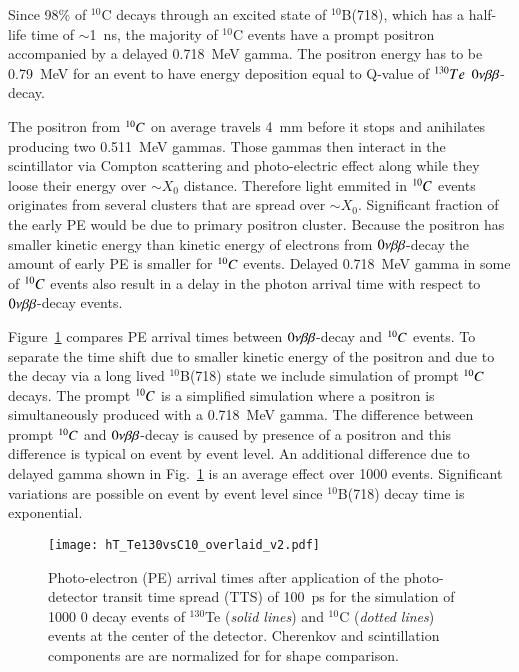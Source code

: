 Since 98\% of $^{10}$C decays through an excited state of $^{10}$B(718), 
which has a half-life time of $\sim$1~ns, the majority of $^{10}$C events have 
a prompt positron accompanied by a delayed 0.718~MeV gamma. The positron energy
has to be 0.79~MeV for an event to have energy deposition equal to Q-value of
$^{130}Te$ $0\nu\beta\beta$-decay.

The positron from $^{10}C$ on average travels 4~mm before it stops and anihilates
producing two 0.511~MeV gammas. Those gammas then interact in the scintillator via 
Compton scattering and photo-electric effect along while they loose their energy
over $\sim X_0$ distance. Therefore light emmited in $^{10}C$ events originates from
several clusters that are spread over $\sim X_0$. Significant fraction of the 
early PE would be due to primary positron cluster. Because the positron has smaller 
kinetic energy than kinetic energy of electrons from $0\nu\beta\beta$-decay the amount of early 
PE is smaller for $^{10}C$ events. Delayed 0.718~MeV gamma in some of $^{10}C$ events 
also result in a delay in the photon arrival time with respect to $0\nu\beta\beta$-decay events.

Figure~\ref{fig:Arrival_time_C10_overlaid} compares PE arrival times between 
$0\nu\beta\beta$-decay and $^{10}C$ events. To separate the time shift due to smaller kinetic 
energy of the positron and due to the decay via a long lived $^{10}$B(718) state we 
include simulation of prompt $^{10}C$ decays. The prompt $^{10}C$ is a simplified simulation 
where a positron is simultaneously produced with a 0.718~MeV gamma. The difference between
prompt $^{10}C$ and $0\nu\beta\beta$-decay is caused by presence of a positron and this 
difference is typical on event by event level. An additional difference due to delayed
gamma shown in Fig.~\ref{fig:Arrival_time_C10_overlaid} is an average effect over 1000 events. 
Significant variations are possible on event by event level since $^{10}$B(718) decay 
time is exponential.

\begin{figure}[h]
  \centering
  \texttt{[image: hT\_Te130vsC10\_overlaid\_v2.pdf]}
  \caption{Photo-electron (PE) arrival times after application of the
    photo-detector transit time spread (TTS) of 100~ps for the
    simulation of 1000 0{\nbb} decay events of $^{130}$Te (\emph{solid
      lines}) and $^{10}$C (\emph{dotted lines}) events at the center
    of the detector. Cherenkov and scintillation components are are normalized for 
    for shape comparison.}
\label{fig:Arrival_time_C10_overlaid}
\end{figure}

